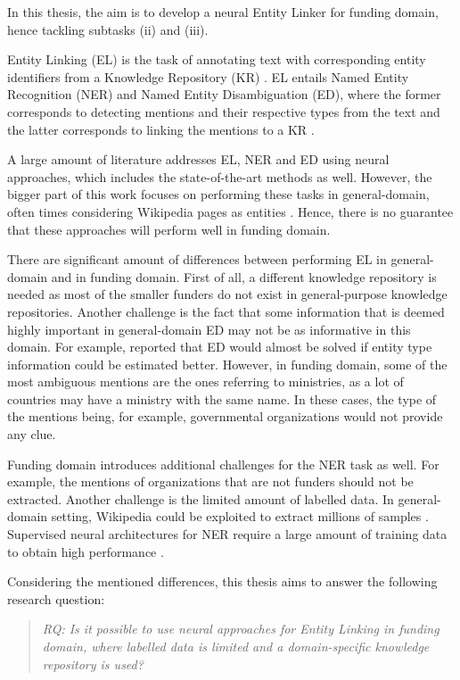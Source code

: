 \documentclass{report}
\theoremstyle{definition}
\theoremstyle{remark}
\begin{document}
\vspace{-0.3cm}\noindent In this thesis, the aim is to develop a neural Entity Linker for funding domain, hence tackling subtasks (ii) and (iii).


Entity Linking (EL) is the task of annotating text with corresponding entity identifiers from a Knowledge Repository (KR) \cite{balog}. EL entails Named Entity Recognition (NER) and Named Entity Disambiguation (ED), where the former corresponds to detecting mentions and their respective types from the text and the latter corresponds to linking the mentions to a KR \cite{balog}. 

A large amount of literature addresses EL, NER and ED using neural approaches, which includes the state-of-the-art methods \cite{REL,LUKE,mulang} as well. However, the bigger part of this work focuses on performing these tasks in general-domain, often times considering Wikipedia pages as entities \cite{nlpnotes}. Hence, there is no guarantee that these approaches will perform well in funding domain.

There are significant amount of differences between performing EL in general-domain and in funding domain. First of all, a different knowledge repository is needed as most of the smaller funders do not exist in general-purpose knowledge repositories.  Another challenge is the fact that some information that is deemed highly important in general-domain ED may not be as informative in this domain. For example, \cite{raiman} reported that ED would almost be solved if entity type information could be estimated better. However, in funding domain, some of the most ambiguous mentions are the ones referring to ministries, as a lot of countries may have a ministry with the same name. In these cases, the type of the mentions being, for example, governmental organizations would not provide any clue. 

Funding domain introduces additional challenges for the NER task as well. For example, the mentions of organizations that are not funders should not be extracted. Another challenge is the limited amount of labelled data. In general-domain setting, Wikipedia could be exploited to extract millions of samples \cite{bunescu-pasca-2006-using}. Supervised neural architectures for NER require a large amount of training data to obtain high performance \cite{NERsurvey}.

Considering the mentioned differences, this thesis aims to answer the following research question:

\begin{quote}\emph{RQ: Is it possible to use neural approaches for Entity Linking in funding domain, where labelled data is limited and a domain-specific knowledge repository is used?}\end{quote}
\end{document}
